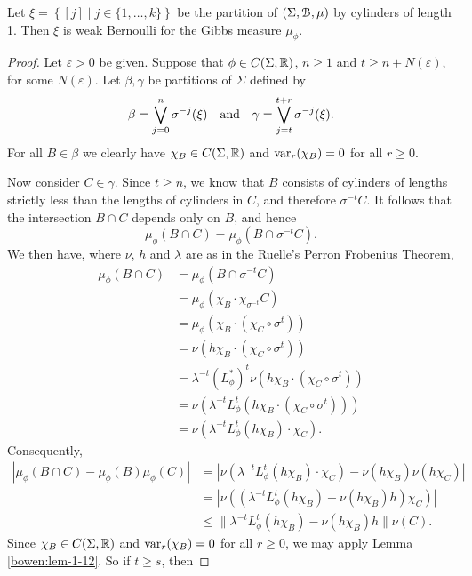 \begin{theorem}\label{thm:gibbs-is-weak-bernoulli}
	Let $\xi = \left\{[j] \mid j \in \{1, \dots, k\}\right\}$ be the partition of $(\Sigma, \mathcal{B}, \mu)$ by cylinders of length 1. Then $\xi$ is weak Bernoulli for the Gibbs measure $\mu_\phi$.
	\begin{proof}
		Let $\varepsilon > 0$ be given. Suppose that $\phi \in C(\Sigma, \mathbb{R})$, $n \geq 1$ and $t \geq n + N(\varepsilon)$, for some $N(\varepsilon)$. Let $\beta, \gamma$ be partitions of $\Sigma$ defined by
		\[
		\beta = \bigvee_{j = 0}^n{\sigma^{-j}(\xi)} \quad \text{and} \quad \gamma = \bigvee_{j = t}^{t + r}{\sigma^{-j}(\xi)}.
		\]
		For all $B \in \beta$ we clearly have $\chi_B \in C(\Sigma, \mathbb{R})$ and $\operatorname{var}_r(\chi_B) = 0$ for all $r \geq 0$.
		
		Now consider $C \in \gamma$. Since $t \geq n$, we know that $B$ consists of cylinders of lengths strictly less than the lengths of cylinders in $C$, and therefore $\sigma^{-t}C$. It follows that the intersection $B \cap C$ depends only on $B$, and hence
		\[
			\mu_\phi(B \cap C) = \mu_\phi(B \cap \sigma^{-t}{C}).
		\]
		We then have, where $\nu$, $h$ and $\lambda$ are as in the Ruelle's Perron Frobenius Theorem,
		\begin{align*}
			\mu_\phi(B \cap C) &= \mu_\phi(B \cap \sigma^{-t}C) \\
				&= \mu_\phi(\chi_B \cdot \chi_{\sigma^{-t}}{C}) \\
				&= \mu_\phi(\chi_B \cdot (\chi_{C} \circ \sigma^t)) \\
				&= \nu(h \chi_B \cdot (\chi_C \circ \sigma^t)) \\
				&= \lambda^{-t}(L_\phi^*)^t\nu(h\chi_B \cdot (\chi_C \circ \sigma^t)) \\
				&= \nu(\lambda^{-t} L_\phi^t(h \chi_B \cdot (\chi_C \circ \sigma^t))) \\
				&= \nu(\lambda^{-t} L_\phi^t(h \chi_B) \cdot \chi_C).
		\end{align*}
		Consequently,
		\begin{align*}
			|\mu_\phi(B \cap C) - \mu_\phi(B)\mu_\phi(C)| &= |\nu(\lambda^{-t} L_\phi^t(h \chi_B) \cdot \chi_C) - \nu(h \chi_B)\nu(h \chi_C)| \\
				&= |\nu((\lambda^{-t} L_\phi^t(h \chi_B) - \nu(h \chi_B)h)\chi_C)| \\
				&\leq \|\lambda^{-t} L_\phi^t(h \chi_B) - \nu(h \chi_B)h\| \nu(C).
		\end{align*}
		Since $\chi_B \in C(\Sigma, \mathbb{R})$ and $\operatorname{var}_r(\chi_B) = 0$ for all $r \geq 0$, we may apply Lemma \ref{bowen:lem-1-12}. So if $t \geq s$, then

\end{proof}
\end{theorem}
